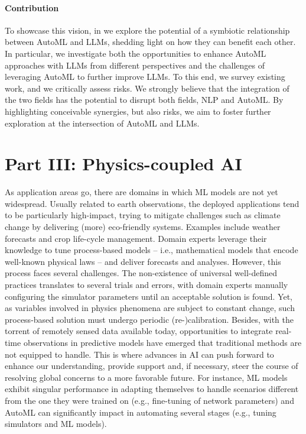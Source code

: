 \paragraph{Contribution} To showcase this vision, in  we explore the potential of a symbiotic relationship between AutoML and LLMs, shedding light on how they can benefit each other.
In particular, we investigate both the opportunities to enhance AutoML approaches with LLMs from different perspectives and the challenges of leveraging AutoML to further improve LLMs.
To this end, we survey existing work, and we critically assess risks.
We strongly believe that the integration of the two fields has the potential to disrupt both fields, NLP and AutoML.
By highlighting conceivable synergies, but also risks, we aim to foster further exploration at the intersection of AutoML and LLMs.

\section*{Part III: Physics-coupled AI}

As application areas go, there are domains in which ML models are not yet widespread.
Usually related to earth observations, the deployed applications tend to be particularly high-impact, trying to mitigate challenges such as climate change by delivering (more) eco-friendly systems.
Examples include weather forecasts and crop life-cycle management.
Domain experts leverage their knowledge to tune process-based models -- i.e., mathematical models that encode well-known physical laws -- and deliver forecasts and analyses.
However, this process faces several challenges.
The non-existence of universal well-defined practices translates to several trials and errors, with domain experts manually configuring the simulator parameters until an acceptable solution is found.
Yet, as variables involved in physics phenomena are subject to constant change, such process-based solution must undergo periodic (re-)calibration.
Besides, with the torrent of remotely sensed data available today, opportunities to integrate real-time observations in predictive models have emerged that traditional methods are not equipped to handle.
This is where advances in AI can push forward to enhance our understanding, provide support and, if necessary, steer the course of resolving global concerns to a more favorable future.
For instance, ML models exhibit singular performance in adapting themselves to handle scenarios different from the one they were trained on (e.g., fine-tuning of network parameters) and AutoML can significantly impact in automating several stages (e.g., tuning simulators and ML models).

